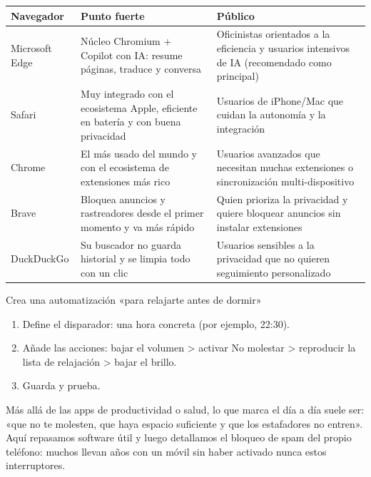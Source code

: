 \begin{center}
\begin{tabularx}{\linewidth}{|X|X|X|}
\hline
\textbf{Navegador} & \textbf{Punto fuerte} & \textbf{Público} \tabularnewline
\hline
Microsoft Edge & Núcleo Chromium + Copilot con IA: resume páginas, traduce y conversa & Oficinistas orientados a la eficiencia y usuarios intensivos de IA (recomendado como principal) \tabularnewline
Safari & Muy integrado con el ecosistema Apple, eficiente en batería y con buena privacidad & Usuarios de iPhone/Mac que cuidan la autonomía y la integración \tabularnewline
Chrome & El más usado del mundo y con el ecosistema de extensiones más rico & Usuarios avanzados que necesitan muchas extensiones o sincronización multi-dispositivo \tabularnewline
Brave & Bloquea anuncios y rastreadores desde el primer momento y va más rápido & Quien prioriza la privacidad y quiere bloquear anuncios sin instalar extensiones \tabularnewline
DuckDuckGo & Su buscador no guarda historial y se limpia todo con un clic & Usuarios sensibles a la privacidad que no quieren seguimiento personalizado \tabularnewline
\hline
\end{tabularx}
\end{center}

\begin{tcbpractice}{Crea una automatización «para relajarte antes de dormir»}
\begin{enumerate}
  \item Define el disparador: una hora concreta (por ejemplo, 22:30).
  \item Añade las acciones: bajar el volumen > activar No molestar > reproducir la lista de relajación > bajar el brillo.
  \item Guarda y prueba.
\end{enumerate}

\end{tcbpractice}


Más allá de las apps de productividad o salud, lo que marca el día a día suele ser: «que no te molesten, que haya espacio suficiente y que los estafadores no entren». Aquí repasamos software útil y luego detallamos el bloqueo de spam del propio teléfono: muchos llevan años con un móvil sin haber activado nunca estos interruptores.



